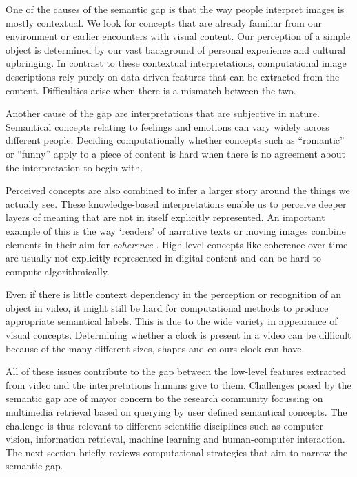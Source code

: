 One of the causes of the semantic gap is that the way people interpret images is mostly contextual\cite{Smeulders:2000tx}. We look for concepts that are already familiar from our environment or earlier encounters with visual content. Our perception of a simple object is determined by our vast background of personal experience and cultural upbringing. In contrast to these contextual interpretations, computational image descriptions rely purely on data-driven features that can be extracted from the content. Difficulties arise when there is a mismatch between the two.

Another cause of the gap are interpretations that are subjective in nature. Semantical concepts relating to feelings and emotions can vary widely across different people. Deciding computationally whether concepts such as ``romantic'' or ``funny'' apply to a piece of content is hard when there is no agreement about the interpretation to begin with.

Perceived concepts are also combined to infer a larger story around the things we actually see. These knowledge-based interpretations enable us to perceive deeper layers of meaning that are not in itself explicitly represented. An important example of this is the way `readers' of narrative texts or moving images combine elements in their aim for \emph{coherence}\cite[p.~38]{Bordwell:1985tz} \cite{gernsbacher1995coherence, Graesser:1994va}. High-level concepts like coherence over time are usually not explicitly represented in digital content and can be hard to compute algorithmically.

Even if there is little context dependency in the perception or recognition of an object in video, it might still be hard for computational methods to produce appropriate semantical labels. This is due to the wide variety in appearance of visual concepts. Determining whether a clock is present in a video can be difficult because of the many different sizes, shapes and colours clock can have. 

All of these issues contribute to the gap between the low-level features extracted from video and the interpretations humans give to them. Challenges posed by the semantic gap are of mayor concern to the research community focussing on multimedia retrieval based on querying by user defined semantical concepts. The challenge is thus relevant to different scientific disciplines such as computer vision, information retrieval, machine learning and human-computer interaction. The next section briefly reviews computational strategies that aim to narrow the semantic gap.

